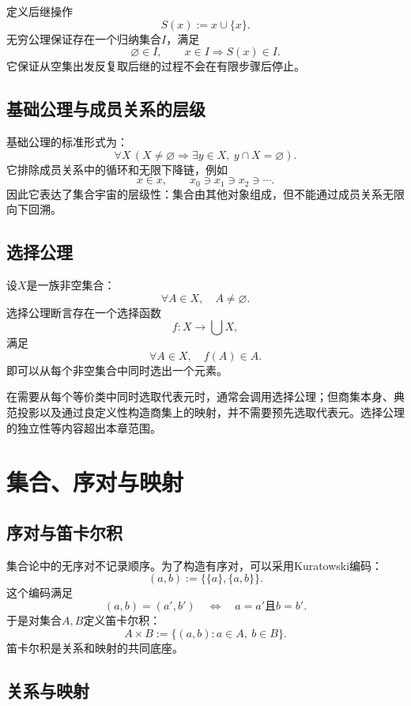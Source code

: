定义后继操作
\[
    S(x):=x\cup\{x\}.
\]
无穷公理保证存在一个归纳集合$I$，满足
\[
    \varnothing\in I,
    \qquad
    x\in I\Rightarrow S(x)\in I.
\]
它保证从空集出发反复取后继的过程不会在有限步骤后停止。

\subsection{基础公理与成员关系的层级}

基础公理的标准形式为：
\[
    \forall X\,
    \left(
    X\neq\varnothing
    \Rightarrow
    \exists y\in X,\ y\cap X=\varnothing
    \right).
\]
它排除成员关系中的循环和无限下降链，例如
\[
    x\in x,
    \qquad
    x_0\ni x_1\ni x_2\ni\cdots.
\]
因此它表达了集合宇宙的层级性：集合由其他对象组成，但不能通过成员关系无限向下回溯。

\subsection{选择公理}

设$X$是一族非空集合：
\[
    \forall A\in X,\quad A\neq\varnothing.
\]
选择公理断言存在一个选择函数
\[
    f:X\to\bigcup X,
\]
满足
\[
    \forall A\in X,\quad f(A)\in A.
\]
即可以从每个非空集合中同时选出一个元素。

在需要从每个等价类中同时选取代表元时，通常会调用选择公理；但商集本身、典范投影以及通过良定义性构造商集上的映射，并不需要预先选取代表元。选择公理的独立性等内容超出本章范围。


\section{集合、序对与映射}

\subsection{序对与笛卡尔积}

集合论中的无序对不记录顺序。为了构造有序对，可以采用Kuratowski编码：
\[
    (a,b):=\bigl\{\{a\},\{a,b\}\bigr\}.
\]
这个编码满足
\[
    (a,b)=(a',b')
    \quad\Longleftrightarrow\quad
    a=a'\text{且}b=b'.
\]
于是对集合$A,B$定义笛卡尔积：
\[
    A\times B
    :=\{(a,b):a\in A,\ b\in B\}.
\]
笛卡尔积是关系和映射的共同底座。

\subsection{关系与映射}

